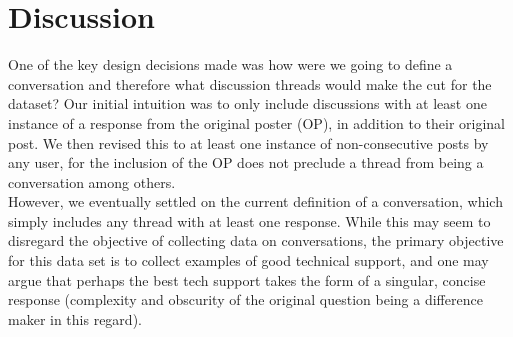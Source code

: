 \documentclass[12pt]{article}
\begin{document}



\section{Discussion}
One of the key design decisions made was how were we going to define a conversation and therefore what discussion threads would make the cut for the dataset? Our initial intuition was to only include discussions with at least one instance of a response from the original poster (OP), in addition to their original post. We then revised this to at least one instance of non-consecutive posts by any user, for the inclusion of the OP does not preclude a thread from being a conversation among others.\\

However, we eventually settled on the current definition of a conversation, which simply includes any thread with at least one response. While this may seem to disregard the objective of collecting data on conversations, the primary objective for this data set is to collect examples of good technical support, and one may argue that perhaps the best tech support takes the form of a singular, concise response (complexity and obscurity of the original question being a difference maker in this regard).




\end{document}
